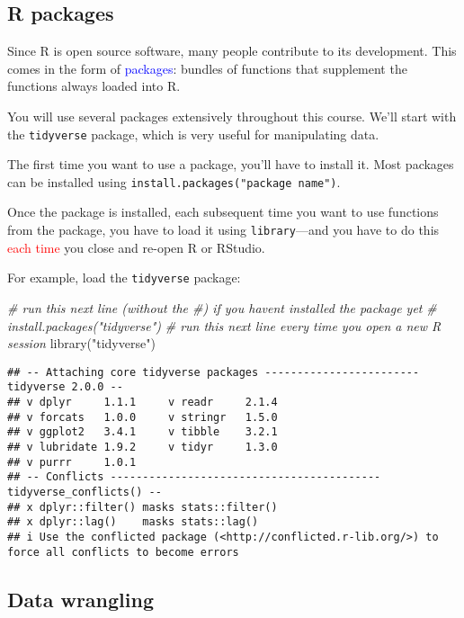 \documentclass[
]{article}
\newenvironment{Shaded}{\begin{snugshade}}{\end{snugshade}}
\newcommand{\CommentTok}[1]{\textcolor[rgb]{0.56,0.35,0.01}{\textit{#1}}}
\newcommand{\FunctionTok}[1]{\textcolor[rgb]{0.00,0.00,0.00}{#1}}
\newcommand{\NormalTok}[1]{#1}
\newcommand{\StringTok}[1]{\textcolor[rgb]{0.31,0.60,0.02}{#1}}
\begin{document}
\hypertarget{r-packages}{%
\subsection{R packages}\label{r-packages}}

Since R is open source software, many people contribute to its
development. This comes in the form of \textcolor{blue}{packages}:
bundles of functions that supplement the functions always loaded into R.

You will use several packages extensively throughout this course. We'll
start with the \texttt{tidyverse} package, which is very useful for
manipulating data.

The first time you want to use a package, you'll have to install it.
Most packages can be installed using
\texttt{install.packages("package\ name")}.

Once the package is installed, each subsequent time you want to use
functions from the package, you have to load it using
\texttt{library}---and you have to do this \textcolor{red}{each time}
you close and re-open R or RStudio.

For example, load the \texttt{tidyverse} package:

\begin{Shaded}
\begin{Highlighting}[]
\CommentTok{\# run this next line (without the \#) if you haven\textquotesingle{}t installed the package yet}
\CommentTok{\# install.packages("tidyverse")}
\CommentTok{\# run this next line every time you open a new R session}
\FunctionTok{library}\NormalTok{(}\StringTok{"tidyverse"}\NormalTok{)}
\end{Highlighting}
\end{Shaded}

\begin{verbatim}
## -- Attaching core tidyverse packages ------------------------ tidyverse 2.0.0 --
## v dplyr     1.1.1     v readr     2.1.4
## v forcats   1.0.0     v stringr   1.5.0
## v ggplot2   3.4.1     v tibble    3.2.1
## v lubridate 1.9.2     v tidyr     1.3.0
## v purrr     1.0.1     
## -- Conflicts ------------------------------------------ tidyverse_conflicts() --
## x dplyr::filter() masks stats::filter()
## x dplyr::lag()    masks stats::lag()
## i Use the conflicted package (<http://conflicted.r-lib.org/>) to force all conflicts to become errors
\end{verbatim}

\hypertarget{data-wrangling}{%
\subsection{Data wrangling}\label{data-wrangling}}
\end{document}
